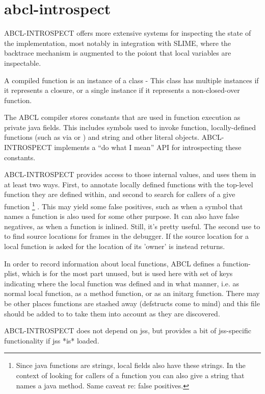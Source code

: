 \documentclass[10pt]{book}
\begin{document}
\section{abcl-introspect}

\textsc{ABCL-INTROSPECT} offers more extensive systems for inspecting the state
of the implementation, most notably in integration with SLIME, where
the backtrace mechanism is augmented to the poiont that local
variables are inspectable.

A compiled function is an instance of a class - This class has
multiple instances if it represents a closure, or a single instance if
it represents a non-closed-over function.

The \textsc{ABCL} compiler stores constants that are used in function
execution as private java fields. This includes symbols used to invoke
function, locally-defined functions (such as via  or
) and string and other literal objects.
\textsc{ABCL-INTROSPECT} implements a ``do what I mean'' API for
introspecting these constants.

ABCL-INTROSPECT provides access to those internal values, and
uses them in at least two ways. First, to annotate locally defined
functions with the top-level function they are defined within, and
second to search for callers of a give function \footnote{ Since java
  functions are strings, local fields also have these strings. In the
  context of looking for callers of a function you can also give a
  string that names a java method. Same caveat re: false positives.}
. This may yield some false positives, such as when a symbol that
names a function is also used for some other purpose. It can also have
false negatives, as when a function is inlined. Still, it's pretty
useful. The second use to to find source locations for frames in the
debugger. If the source location for a local function is asked for the
location of its 'owner' is instead returns.

In order to record information about local functions, ABCL defines a
function-plist, which is for the most part unused, but is used here
with set of keys indicating where the local function was defined and
in what manner, i.e. as normal local function, as a method function,
or as an initarg function. There may be other places functions are
stashed away (defstructs come to mind) and this file should be added
to to take them into account as they are discovered.

ABCL-INTROSPECT does not depend on jss, but provides a bit of
jss-specific functionality if jss *is* loaded.
\end{document}

